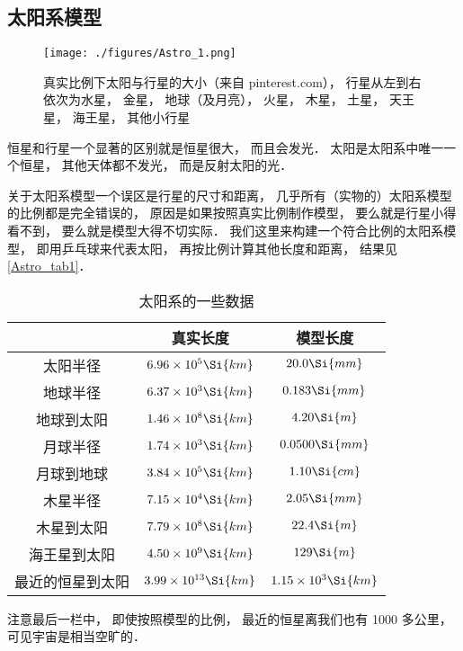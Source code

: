 
\subsection{太阳系模型}

\begin{figure}[ht]
\centering
\texttt{[image: ./figures/Astro\_1.png]}
\caption{真实比例下太阳与行星的大小（来自 pinterest.com）， 行星从左到右依次为水星， 金星， 地球（及月亮）， 火星， 木星， 土星， 天王星， 海王星， 其他小行星} \label{Astro_fig1}
\end{figure}

恒星和行星一个显著的区别就是恒星很大， 而且会发光． 太阳是太阳系中唯一一个恒星， 其他天体都不发光， 而是反射太阳的光．

关于太阳系模型一个误区是行星的尺寸和距离， 几乎所有（实物的）太阳系模型的比例都是完全错误的， 原因是如果按照真实比例制作模型， 要么就是行星小得看不到， 要么就是模型大得不切实际． 我们这里来构建一个符合比例的太阳系模型， 即用乒乓球来代表太阳， 再按比例计算其他长度和距离， 结果见\autoref{Astro_tab1}．

\begin{table}[ht]
\centering
\caption{太阳系的一些数据}\label{Astro_tab1}
\begin{tabular}{|c|c|c|}
\hline
 & 真实长度 & 模型长度 \\
\hline
太阳半径 & $6.96\times 10^5 \Si{km}$ & $20.0 \Si{mm}$\\
\hline
地球半径 &  $6.37\times 10^3 \Si{km}$ & $0.183 \Si{mm}$\\
\hline
地球到太阳  &  $1.46 \times 10^8 \Si{km}$ & $4.20 \Si{m}$\\
\hline
月球半径 & $1.74 \times 10^3 \Si{km}$ & $0.0500 \Si{mm}$\\
\hline
月球到地球 & $3.84 \times 10^5 \Si{km}$ &  $1.10 \Si{cm}$\\
\hline
木星半径 & $7.15 \times 10^4 \Si{km}$ & $2.05 \Si{mm}$\\
\hline
木星到太阳 & $7.79 \times 10^8 \Si{km}$ & $22.4 \Si{m}$\\
\hline
海王星到太阳 & $4.50 \times 10^9 \Si{km}$ & $129 \Si{m}$\\
\hline
最近的恒星到太阳 & $3.99 \times 10^{13} \Si{km}$ &  $1.15 \times 10^3 \Si{km}$\\
\hline
\end{tabular}
\end{table}
注意最后一栏中， 即使按照模型的比例， 最近的恒星离我们也有 1000 多公里， 可见宇宙是相当空旷的．

